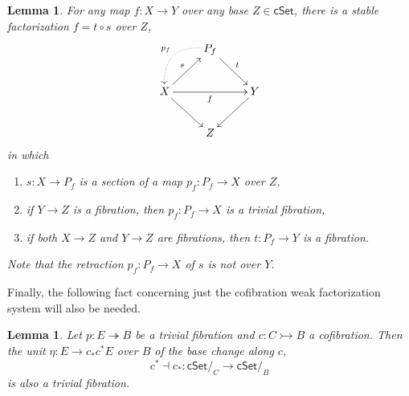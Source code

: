 \documentclass[11pt,reqno]{amsart}
\newcommand{\cSet}{\ensuremath{\mathsf{cSet}}}
\newcommand{\mono}{\ensuremath{\rightarrowtail}}
\newcommand{\ra}{\ensuremath{\rightarrow}}
\renewcommand{\to}{\ensuremath{\rightarrow}}
\newcommand{\too}{\ensuremath{\longrightarrow}}
\newcommand{\onto}{\ensuremath{\twoheadrightarrow}}
\newtheorem{lemma}[theorem]{Lemma}
\theoremstyle{remark}
\theoremstyle{definition}
\begin{document}
\begin{lemma}\label{lemma:relative_pathspace_factorization} 
For any map $f : X\ra Y$  over any base $Z\in \cSet$, 
there is a stable factorization $f = t\circ s$ over $Z$,
%  
\begin{equation}\label{diag:pathspace_factorization4}
\xymatrix{
&   \ar@{.>}@/_1.5pc/[ld]_{p_f} P_f \ar[rd]^t & \\
X \ar[rr]_f \ar[rd] \ar[ru]^{s} && Y \ar[ld] \\
& Z
}
\end{equation}
%
in which
\begin{enumerate}
\item $s : X \to P_f$ is a section of a map $p_f : P_f \to X$ over $Z$,
\item  if $Y\to Z$ is a fibration, then $p_f : P_f \to X$ is a trivial fibration,
\item if both $X\to Z$ and $Y\to Z$ are fibrations, then $t : P_f \to Y$ is a fibration.
\end{enumerate}
Note that the retraction $p_f : P_f \ra X$ of $s$ is not over $Y$.
\end{lemma}

Finally, the following fact concerning just the cofibration weak factorization system will also be needed.

\begin{lemma}\label{lemma:etaTF}
Let $p: E \onto B$ be a trivial fibration and $c : C\mono B$ a cofibration.  Then the unit $\eta:E \ra c_*c^*E$ over $B$ of the base change along $c$,
\[
c^*\dashv c_* : \cSet/_C \too \cSet/_B
\]
is also a trivial fibration.
\end{lemma}
\end{document}
